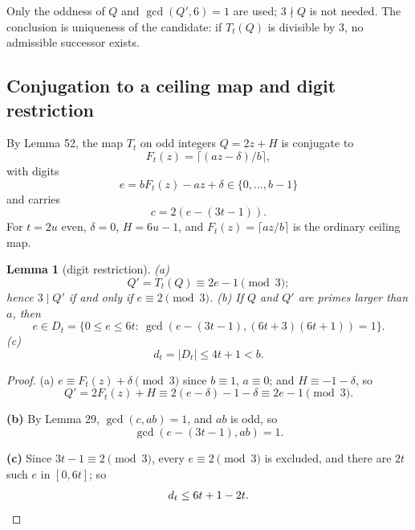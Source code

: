 \documentclass[11pt,reqno]{amsart}
\newtheorem{lemma}[theorem]{Lemma}
\theoremstyle{definition}
\theoremstyle{remark}
\begin{document}
Only the oddness of \(Q\) and \(\gcd(Q',6)=1\) are used; \(3\nmid Q\)
is not needed. The conclusion is uniqueness of the candidate: if
\(T_t(Q)\) is divisible by \(3\), no admissible successor exists.

\subsection{Conjugation to a ceiling map and digit restriction}\label{sec:C.2}

By Lemma 52, the map \(T_t\) on odd integers \(Q=2z+H\) is conjugate to
\[
F_t(z)=\lceil(az-\delta)/b\rceil,
\]
with digits
\[
e=bF_t(z)-az+\delta\in\{0,\ldots,b-1\}
\]
and carries
\[
c=2(e-(3t-1)).
\]
For \(t=2u\) even, \(\delta=0\), \(H=6u-1\), and
\(F_t(z)=\lceil az/b\rceil\) is the ordinary ceiling map.

\begin{samepage}
\begin{lemma}[digit restriction]\leavevmode\label{thm:56}
(a)
\[
Q'=T_t(Q)\equiv2e-1\pmod3;
\]
hence \(3\mid Q'\) if and only if \(e\equiv2\pmod3\). (b) If \(Q\) and
\(Q'\) are primes larger than \(a\), then
\[
e\in D_t=\{0\le e\le6t:\ \gcd(e-(3t-1),(6t+3)(6t+1))=1\}.
\]
(c)
\[
d_t=|D_t|\le4t+1<b.
\]
\label{thm-end:56}
\end{lemma}
\end{samepage}

\begin{proof}\leavevmode\label{proof:56}
(a) \(e\equiv F_t(z)+\delta\pmod3\) since \(b\equiv1\),
\(a\equiv0\); and \(H\equiv-1-\delta\), so
\[
Q'=2F_t(z)+H\equiv2(e-\delta)-1-\delta\equiv2e-1\pmod3.
\]

\textbf{(b)} By
Lemma 29, \(\gcd(c,ab)=1\), and \(ab\) is odd, so
\[
\gcd(e-(3t-1),ab)=1.
\]

\textbf{(c)} Since \(3t-1\equiv2\pmod3\), every
\(e\equiv2\pmod3\) is excluded, and there are \(2t\) such \(e\) in
\([0,6t]\); so
\[
d_t\le6t+1-2t.\qedhere
\]
\end{proof}

\end{document}
